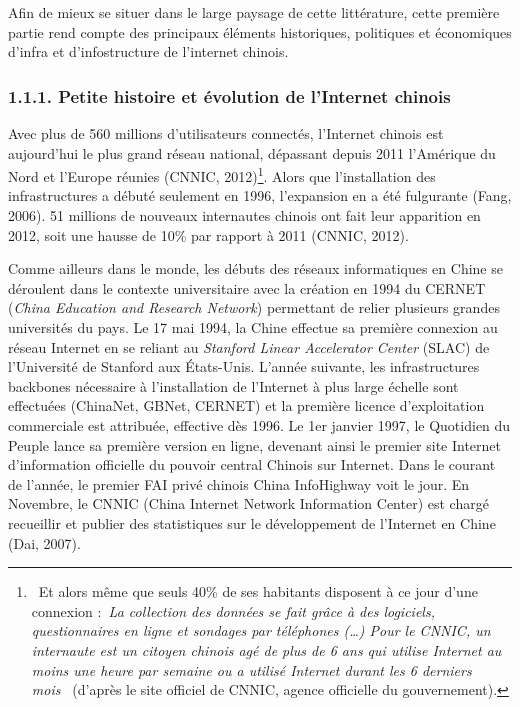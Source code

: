 \bigskip

{\color{black}
Afin de mieux se situer dans le large paysage de cette litt\'erature, cette premi\`ere partie rend compte des principaux
\'el\'ements historiques, politiques et \'economiques d'infra et d'infostructure de l'internet chinois.}

\subsubsection[1.1.1. Petite histoire et \'evolution de l{}'Internet chinois]{1.1.1. Petite histoire et \'evolution de
l'Internet chinois}
\hypertarget{RefHeading51699228146}{}{\color{black}
Avec plus de 560 millions d'utilisateurs connect\'es, l'Internet chinois est aujourd'hui le plus grand r\'eseau
national, d\'epassant depuis 2011 l'Am\'erique du Nord et l'Europe r\'eunies (CNNIC,
2012)\footnote{\textsf{\ }\textsf{Et alors m\^eme que seuls 40\% de ses habitants disposent \`a ce jour d'une connexion
:}\textsf{\textit{{\guillemotleft}~La collection des donn\'ees se fait gr\^ace \`a des logiciels, questionnaires en
ligne et sondages par t\'el\'ephones ({\dots}) Pour le CNNIC, un internaute est un citoyen chinois ag\'e de plus de 6
ans qui utilise Internet au moins une heure par semaine ou a utilis\'e Internet durant les 6 derniers
mois~{\guillemotright} }}\textsf{(d'apr\`es le site officiel de CNNIC, agence officielle du gouvernement).}}. Alors que
l'installation des infrastructures a d\'ebut\'e seulement en 1996, l'expansion en a \'et\'e fulgurante (Fang, 2006). 51
millions de nouveaux internautes chinois ont fait leur apparition en 2012, soit une hausse de 10\% par rapport \`a 2011
(CNNIC, 2012). }


\bigskip

{\color{black}
Comme ailleurs dans le monde, les d\'ebuts des r\'eseaux informatiques en Chine se d\'eroulent dans le contexte
universitaire avec la cr\'eation en 1994 du CERNET (\textit{China Education and Research Network}) permettant de relier
plusieurs grandes universit\'es du pays. Le 17 mai 1994, la Chine effectue sa premi\`ere connexion au r\'eseau Internet
en se reliant au \textit{Stanford Linear Accelerator Center }(SLAC) de l{}'Universit\'e de Stanford aux \'Etats-Unis.
L'ann\'ee suivante, les infrastructures backbones n\'ecessaire \`a l'installation de l'Internet \`a plus large
\'echelle sont effectu\'ees (ChinaNet, GBNet, CERNET) et la premi\`ere licence d'exploitation commerciale est
attribu\'ee, effective d\`es 1996. Le 1er janvier 1997, le Quotidien du Peuple lance sa premi\`ere version en ligne,
devenant ainsi le premier site Internet d'information officielle du pouvoir central Chinois sur Internet. Dans le
courant de l'ann\'ee, le premier FAI priv\'e chinois China InfoHighway voit le jour. En Novembre, le CNNIC (China
Internet Network Information Center) est charg\'e recueillir et publier des statistiques sur le d\'eveloppement de
l'Internet en Chine (Dai, 2007).}


